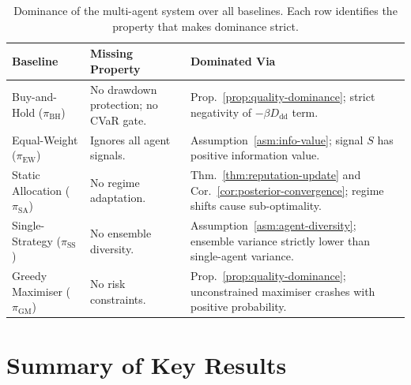 \documentclass[12pt,openany]{book}
\numberwithin{equation}{chapter}
\theoremstyle{plain}
\theoremstyle{definition}
\theoremstyle{remark}
\numberwithin{equation}{chapter}
\theoremstyle{plain}
\begin{document}
\begin{table}[H]
\centering
\caption{Dominance of the multi-agent system over all baselines.
Each row identifies the property that makes dominance strict.}
\label{tab:dominance}
\small
\begin{tabularx}{\linewidth}{@{} l X X @{}}
\toprule
\textbf{Baseline} & \textbf{Missing Property} & \textbf{Dominated Via} \\
\midrule
Buy-and-Hold ($\pi_{\mathrm{BH}}$)
  & No drawdown protection; no CVaR gate.
  & Prop.~\ref{prop:quality-dominance}; strict negativity of
    $-\beta D_{\mathrm{dd}}$ term. \\[4pt]
Equal-Weight ($\pi_{\mathrm{EW}}$)
  & Ignores all agent signals.
  & Assumption~\ref{asm:info-value}; signal $S$ has positive
    information value. \\[4pt]
Static Allocation ($\pi_{\mathrm{SA}}$)
  & No regime adaptation.
  & Thm.~\ref{thm:reputation-update} and
    Cor.~\ref{cor:posterior-convergence}; regime shifts
    cause sub-optimality. \\[4pt]
Single-Strategy ($\pi_{\mathrm{SS}}$)
  & No ensemble diversity.
  & Assumption~\ref{asm:agent-diversity}; ensemble variance
    strictly lower than single-agent variance. \\[4pt]
Greedy Maximiser ($\pi_{\mathrm{GM}}$)
  & No risk constraints.
  & Prop.~\ref{prop:quality-dominance}; unconstrained
    maximiser crashes with positive probability. \\
\bottomrule
\end{tabularx}
\end{table}

\chapter*{Summary of Key Results}
\end{document}
